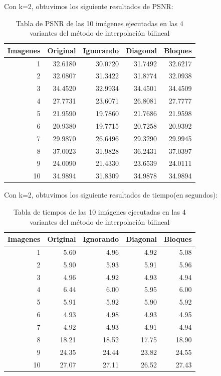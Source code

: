\documentclass[a4paper]{article}
\newcounter{col}
\begin{document}
Con k=2, obtuvimos los siguiente resultados de PSNR:\\
\begin{table}[H]
\centering
\begin{tabular}{|r|r|r|r|r|}
\hline
\multicolumn{1}{|c|}{Imagenes} & \multicolumn{1}{c|}{Original} & \multicolumn{1}{c|}{Ignorando} & \multicolumn{1}{c|}{Diagonal} & \multicolumn{1}{c|}{Bloques} \\ \hline
1 & 32.6180 & 30.0720 & 31.7492 & 32.6217 \\ \hline
2 & 32.0807 &  31.3422 & 31.8774 & 32.0938 \\ \hline
3 & 34.4520 &  32.9934 & 34.4501 &  34.4509 \\ \hline
4 & 27.7731 & 23.6071 & 26.8081 & 27.7777 \\ \hline
5 & 21.9590 &  19.7860 & 21.7686 & 21.9598 \\ \hline
6 & 20.9380 & 19.7715 & 20.7258 &  20.9392 \\ \hline
7 & 29.9870 & 26.6496 & 29.3290 & 29.9945 \\ \hline
8 & 37.0023 & 31.9828 & 36.2431 & 37.0397 \\ \hline
9 & 24.0090 & 21.4330 & 23.6539 & 24.0111 \\ \hline
10 & 34.9894 & 31.8309 & 34.9878 & 34.9894 \\ \hline
\end{tabular}
\caption{Tabla de PSNR de las 10 im\'agenes ejecutadas en las 4 variantes del m\'etodo de interpolaci\'on bilineal}
\label{}
\end{table}
Con k=2, obtuvimos los siguiente resultados de tiempo(en segundos):\\
\begin{table}[H]
\centering
\begin{tabular}{|r|r|r|r|r|}
\hline
\multicolumn{1}{|c|}{Imagenes} & \multicolumn{1}{c|}{Original} & \multicolumn{1}{c|}{Ignorando} & \multicolumn{1}{c|}{Diagonal} & \multicolumn{1}{c|}{Bloques} \\ \hline
1 & 5.60 & 4.96 & 4.92 & 5.08 \\ \hline
2 & 5.90 &  5.93 & 5.91 & 5.96 \\ \hline
3 & 4.96 &  4.92 & 4.93 &  4.94 \\ \hline
4 & 6.44 & 6.00 & 5.95 & 6.00 \\ \hline
5 & 5.91 &  5.92 & 5.90 & 5.92 \\ \hline
6 & 4.93 & 4.98 & 4.93 &  4.95 \\ \hline
7 & 4.92 & 4.93 & 4.91 & 4.94 \\ \hline
8 & 18.21 & 18.52 & 17.75 & 18.90 \\ \hline
9 & 24.35 & 24.44 & 23.82 & 24.55 \\ \hline
10 & 27.07 & 27.11 & 26.52 & 27.43 \\ \hline
\end{tabular}
\caption{Tabla de tiempos de las 10 im\'agenes ejecutadas en las 4 variantes del m\'etodo de interpolaci\'on bilineal}
\label{}
\end{table}
\end{document}
